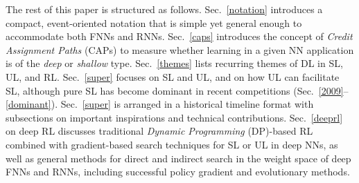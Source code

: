 \documentclass[letterpaper]{article}
\begin{document}
\begin{CJK*}{UTF8}{gbsn}
The rest of this paper is
structured as follows.
Sec.~\ref{notation} introduces
a compact, event-oriented notation that is simple yet general enough to accommodate both
FNNs and RNNs. 
Sec.~\ref{caps} introduces the concept of {\em Credit Assignment Paths} (CAPs) to measure whether learning in a given  NN application is of the {\em deep} or {\em shallow} type.
Sec.~\ref{themes} lists recurring themes of DL in SL, UL, and RL. 
Sec.~\ref{super}  focuses on SL and UL, 
and on how UL can facilitate SL, although pure SL
has become dominant in recent competitions  
(Sec.~\ref{2009}--\ref{dominant}).
Sec.~\ref{super} is arranged in a
historical timeline format with 
subsections on
important inspirations and technical contributions.
Sec.~\ref{deeprl} on deep RL discusses traditional
{\em Dynamic Programming} (DP)-based RL 
combined with gradient-based search techniques for SL or UL in deep NNs, 
as well as general methods for direct and indirect search in the weight space of deep 
FNNs and RNNs, 
including successful policy gradient and evolutionary methods.



%
%
%
%
%
\end{CJK*}
\end{document}
